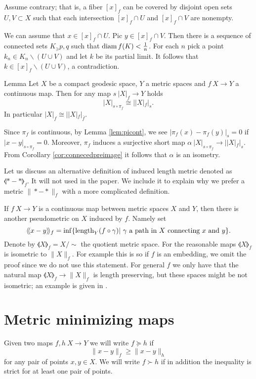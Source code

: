 \documentclass{article}
\begin{document}
Assume contrary;
that is, a fiber $[x]_f$ can be covered by disjoint open sets $U,V\subset X$ such that each intersection 
$[x]_f\cap U$ and $[x]_f\cap V$ are nonempty.

We can assume that $x\in [x]_f\cap U$.
Pic $y\in [x]_f\cap V$.
Then there is a sequence of connected sets $K_\ni p,q$ such that $\mathop{\rm diam}\nolimits f(K)<\tfrac1n$.
For each $n$ pick a point $k_n\in K_n\backslash (U\cup V)$ and let $k$ be its partial limit.
It follows that $k\in [x]_f\backslash (U\cup V)$, a contradiction.
\qeds

\begin{thm}{Lemma}\label{lem:idem}
Let $X$ be a compact geodesic space, $Y$ a metric spaces and $f\:X\to Y$ a continuous map.
 Then for any map $s\:|X|_f\to Y$ holds
\[|X|_{s\circ\pi_f}\cong||X|_{f}|_s.\]
In particular $|X|_{f}\cong||X|_{f}|_{\bar f}$. %
\end{thm}

Since $\pi_f$ is continuous, by Lemma \ref{lem:picont}, we see $|\pi_f(x)-\pi_f(y)|_s=0$ if $|x-y|_{s\circ\pi_f}=0$. 
Moreover, $\pi_f$ induces a surjective short map $\alpha\:|X|_{s\circ\pi_f}\to||X|_{f}|_s$. 
From Corollary \ref{cor:connecedpreimage} it follows that
 $\alpha$ is an isometry.
\qeds

Let us discuss an alternative definition of induced length metric denoted as $\llangle {*}-{*}\rrangle_f$.
It will not used in the paper.
We include it to explain why we prefer a metric $\|{*}-{*}\|_f$ with a more complicated definition.

If $f\:X\to Y$ is a continuous map between metric spaces $X$ and $Y$, then there is another pseudometric on $X$ induced by $f$. 
Namely set 
\[\langle\!\langle x-y\rangle\!\rangle_f=\inf\{\mathop{\rm length}\nolimits_Y(f\circ\gamma)|\ \gamma \text{ a path in } X\text{ connecting }x\text{ and }y\}.\]
Denote by $\llangle X\rrangle_f=X/\sim$ the quotient metric space. 
For the reasonable maps $\llangle X\rrangle_f$ is isometric to $\|X\|_f$.
For example this is so if $f$ is an embedding, we omit the proof since we do not use this statement.
For general $f$ we only have that the natural map $\llangle X\rrangle_f\to \|X\|_f$ is length preserving,
but these spaces might be not isometric;
an example is given in \cite[4.2]{petrunin-intrinisic}.


\section{Metric minimizing maps}\label{Metric minimizing maps}
Given two maps $f,h\:X\to Y$ we will write $f\succcurlyeq h$ if 
\[\|x-y\|_f\ge \|x-y\|_h\]
for any pair of points $x,y\in X$.
We will write $f\succ h$ if in addition the inequality is strict for at least one pair of points.
\end{document}
